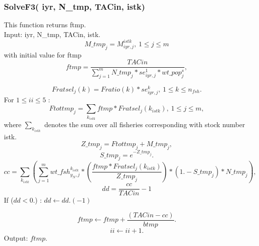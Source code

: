 \documentclass{article}
\begin{document}


\subsubsection{SolveF3( iyr, N\_tmp,  TACin, istk)}
This function returns ftmp.\\
Input:  iyr, N\_tmp,  TACin, istk.
\begin{equation}
    M\_tmp_j=M^{istk}_{iyr,j}, \ 1\leq j \leq m
\end{equation}
with initial value for ftmp
\begin{equation}
    ftmp=\dfrac{TACin}{\sum_{j=1}^mN\_tmp_j*se^1_{iyr,j}*wt\_pop^s_j},
\end{equation}

\begin{equation}
    Fratsel_j(k)=Fratio(k)*se^k_{iyr,j}, \ 1\leq k \leq n_{fsh}.
\end{equation}
For $1 \leq ii \leq 5$ :
\begin{equation}
    Ftottmp_j= \sum_{k_{istk}}ftmp*Fratsel_j(k_{istk}), \ 1\leq j \leq m,
\end{equation}
where $\displaystyle\sum_{k_{istk}}$ denotes the sum over all fisheries corresponding with stock number istk.
\begin{equation}
    Z\_tmp_j=Ftottmp_j+M\_tmp_j,
\end{equation}
\begin{equation}
    S\_tmp_j=e^{-Z\_tmp_j}.
\end{equation}
\begin{equation}
    cc=\sum_{k_{istk}}\left(\sum_{j=1}^m wt\_fsh^{k_{istk}}_{y_N,j}*\left(\dfrac{ftmp*Fratsel_j(k_{istk})}{Z\_tmp_j}\right)*(1.-S\_tmp_j)*N\_tmp_j\right),
\end{equation}
\begin{equation}
    dd=\dfrac{cc}{TACin}-1
\end{equation}
If ($dd<0.$) :   $dd \leftarrow dd . (-1)$

\begin{equation}
    ftmp \leftarrow ftmp + \dfrac{(TACin-cc)}{btmp}.
\end{equation}
\begin{equation}
    ii \leftarrow ii +1.
\end{equation}
Output: $ftmp$.
\end{document}
